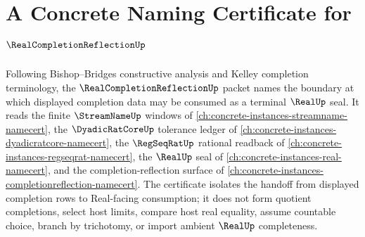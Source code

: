 \chapter{A Concrete Naming Certificate for $\RealCompletionReflectionUp$}
\label{ch:concrete-instances-real-completion-reflection-namecert}

Following Bishop--Bridges constructive analysis and Kelley completion terminology, the $\RealCompletionReflectionUp$ packet names the boundary at which displayed completion data may be consumed as a terminal $\RealUp$ seal. It reads the finite $\StreamNameUp$ windows of \autoref{ch:concrete-instances-streamname-namecert}, the $\DyadicRatCoreUp$ tolerance ledger of \autoref{ch:concrete-instances-dyadicratcore-namecert}, the $\RegSeqRatUp$ rational readback of \autoref{ch:concrete-instances-regseqrat-namecert}, the $\RealUp$ seal of \autoref{ch:concrete-instances-real-namecert}, and the completion-reflection surface of \autoref{ch:concrete-instances-completionreflection-namecert}. The certificate isolates the handoff from displayed completion rows to Real-facing consumption; it does not form quotient completions, select host limits, compare host real equality, assume countable choice, branch by trichotomy, or import ambient $\RealUp$ completeness.

